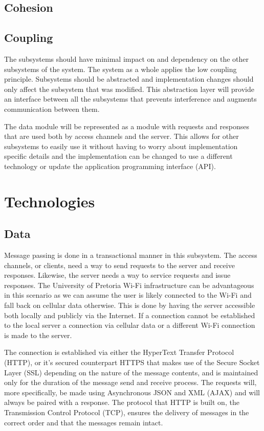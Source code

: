 \documentclass[11pt]{article}
\begin{document}
	\subsection{Cohesion}
	\subsection{Coupling}
	The subsystems should have minimal impact on and dependency on the other subsystems of the system. The system as a whole applies the low coupling principle. Subsystems should be abstracted and implementation changes should only affect the subsystem that was modified. This abstraction layer will provide an interface between all the subsystems that prevents interference and augments communication between them.
	
	The data module will be represented as a module with requests and responses that are used both by access channels and the server. This allows for other subsystems to easily use it without having to worry about implementation specific details and the implementation can be changed to use a different technology or update the application programming interface (API).
	
	\section{Technologies}
	\subsection{Data}
	Message passing is done in a transactional manner in this subsystem. The access channels, or clients, need a way to send requests to the server and receive responses. Likewise, the server needs a way to service requests and issue responses. The University of Pretoria Wi-Fi infrastructure can be advantageous in this scenario as we can assume the user is likely connected to the Wi-Fi and fall back on cellular data otherwise. This is done by having the server accessible both locally and publicly via the Internet. If a connection cannot be established to the local server a connection via cellular data or a different Wi-Fi connection is made to the server.
	
	The connection is established via either the HyperText Transfer Protocol (HTTP), or it's secured counterpart HTTPS that makes use of the Secure Socket Layer (SSL) depending on the nature of the message contents, and is maintained only for the duration of the message send and receive process. The requests will, more specifically, be made using Asynchronous JSON and XML (AJAX) and will always be paired with a response. The protocol that HTTP is built on, the Transmission Control Protocol (TCP), ensures the delivery of messages in the correct order and that the messages remain intact.
\end{document}
